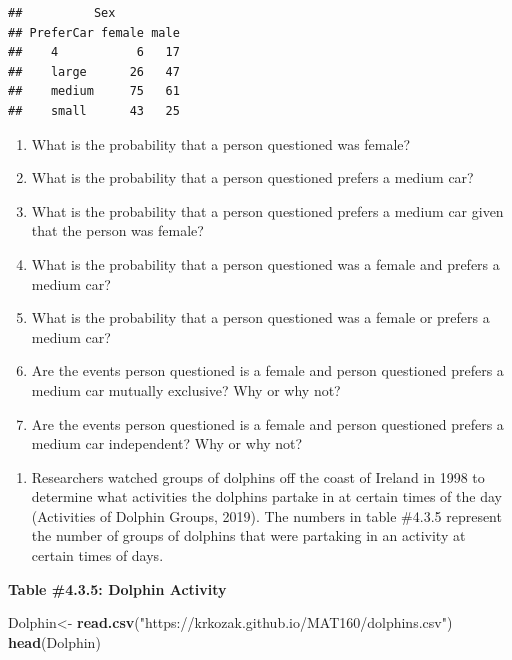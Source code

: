 \documentclass[]{book}
\newenvironment{Shaded}{\begin{snugshade}}{\end{snugshade}}
\newcommand{\KeywordTok}[1]{\textcolor[rgb]{0.13,0.29,0.53}{\textbf{#1}}}
\newcommand{\NormalTok}[1]{#1}
\newcommand{\StringTok}[1]{\textcolor[rgb]{0.31,0.60,0.02}{#1}}
\providecommand{\tightlist}{%
  \setlength{\itemsep}{0pt}\setlength{\parskip}{0pt}}
\begin{document}
\begin{verbatim}
##          Sex
## PreferCar female male
##    4           6   17
##    large      26   47
##    medium     75   61
##    small      43   25
\end{verbatim}

\begin{enumerate}
\def\labelenumi{\alph{enumi}.}
\tightlist
\item
  What is the probability that a person questioned was female?
\item
  What is the probability that a person questioned prefers a medium car?
\item
  What is the probability that a person questioned prefers a medium car given that the person was female?
\item
  What is the probability that a person questioned was a female and prefers a medium car?
\item
  What is the probability that a person questioned was a female or prefers a medium car?
\item
  Are the events person questioned is a female and person questioned prefers a medium car mutually exclusive? Why or why not?
\item
  Are the events person questioned is a female and person questioned prefers a medium car independent? Why or why not?
\end{enumerate}

\begin{enumerate}
\def\labelenumi{\arabic{enumi}.}
\setcounter{enumi}{11}
\tightlist
\item
  Researchers watched groups of dolphins off the coast of Ireland in
  1998 to determine what activities the dolphins partake in at certain
  times of the day (Activities of Dolphin Groups, 2019). The numbers in
  table \#4.3.5 represent the number of groups of dolphins that were
  partaking in an activity at certain times of days.
\end{enumerate}

\textbf{Table \#4.3.5: Dolphin Activity}

\begin{Shaded}
\begin{Highlighting}[]
\NormalTok{Dolphin<-}\StringTok{ }\KeywordTok{read.csv}\NormalTok{(}\StringTok{"https://krkozak.github.io/MAT160/dolphins.csv"}\NormalTok{) }
\KeywordTok{head}\NormalTok{(Dolphin)}
\end{Highlighting}
\end{Shaded}
\end{document}
